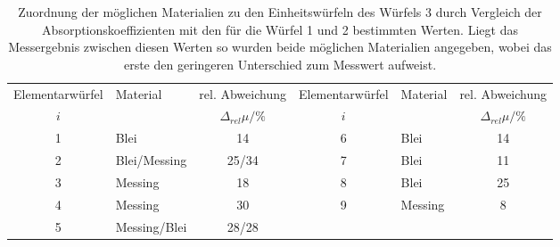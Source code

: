 \begin{table}[!h]
	\centering
\begin{adjustbox}{width=\textwidth}
	\begin{tabular}{clcclc}
		\toprule
		Elementarwürfel & Material & rel. Abweichung & Elementarwürfel & Material & rel. Abweichung\\
		$i$ & & $\Delta_{rel}\mu/\%$ & $i$ & &$\Delta_{rel}\mu /\%$\\
\midrule
		\num{1} & Blei & \num{14}   & \num{6}& Blei& \num{14}\\
		\num{2} & Blei/Messing & \num{25}/\num{34}& \num{7}& Blei & \num{11}\\
		\num{3} & Messing  &\num{18} &\num{8}& Blei& \num{25}\\
		\num{4} & Messing & \num{30}  & \num{9}& Messing& \num{8}\\
		\num{5} & Messing/Blei & \num{28}/\num{28} &  &   &  \\
		
		\bottomrule
	\end{tabular}
\end{adjustbox}
	\caption{Zuordnung der möglichen Materialien zu den Einheitswürfeln des Würfels 3
		durch Vergleich der Absorptionskoeffizienten mit den für die Würfel 1 und 2 bestimmten 
		Werten. Liegt das Messergebnis zwischen diesen Werten so wurden beide möglichen Materialien angegeben, wobei das erste den geringeren Unterschied zum Messwert aufweist. \label{tab:Materialien_Block3}}
\end{table}
